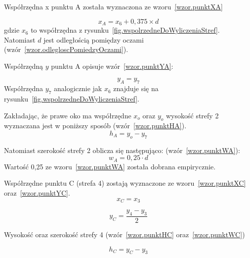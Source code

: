 \documentclass[a4paper,twoside,12pt]{book}
\begin{document}
    Współrzędna x punktu A została wyznaczona ze wzoru~\ref{wzor.punktXA}

    \large
    \begin{equation}
        x_{A}=x_{6} + 0,375 \times d
        \label{wzor.punktXA}
    \end{equation}
    \normalsize
    gdzie $x_{6}$ to współrzędna z rysunku~\ref{fig.wspolrzedneDoWyliczeniaStref}.
    Natomiast $d$ jest odległością pomiędzy oczami (wzór~\ref{wzor.odlegloscPomiedzyOczami}).

    Współrzędną $y$ punktu A opisuje wzór~\ref{wzor.punktYA}:

    \large
    \begin{equation}
        y_{A}=y_{7}
        \label{wzor.punktYA}
    \end{equation}
    \normalsize
    Współrzędna $y_{7}$ analogicznie jak $x_{6}$ znajduje się na rysunku~\ref{fig.wspolrzedneDoWyliczeniaStref}.

    Zakładając, że prawe oko ma współrzędne $x_{o}$ oraz  $y_{o}$ wysokość strefy 2 wyznaczana jest w poniższy sposób
    (wzór~\ref{wzor.punktHA}).
    \large
    \begin{equation}
        h_{A}=y_{o}-y_{7}
        \label{wzor.punktHA}
    \end{equation}
    \normalsize

    Natomiast szerokość strefy 2 oblicza się następująco: (wzór~\ref{wzor.punktWA}):
    \large
    \begin{equation}
        w_{A}=0,25 \cdot d
        \label{wzor.punktWA}
    \end{equation}
    \normalsize
    Wartość 0,25 ze wzoru~\ref{wzor.punktWA} została dobrana empirycznie.

    Współrzędne punktu C (strefa 4) zostają wyznaczone ze wzoru~\ref{wzor.punktXC} oraz~\ref{wzor.punktYC}.
    \large
    \begin{equation}
        x_{C}=x_{3}
        \label{wzor.punktXC}
    \end{equation}
    \normalsize

    \large
    \begin{equation}
        y_{C}= \frac{y_{4} - y_{3}}{2}
        \label{wzor.punktYC}
    \end{equation}
    \normalsize

    Wysokość oraz szerokość strefy 4 (wzór~\ref{wzor.punktHC} oraz~\ref{wzor.punktWC})

    \large
    \begin{equation}
        h_{C}=y_{C} - y_{3}
        \label{wzor.punktHC}
    \end{equation}
    \normalsize
\end{document}
